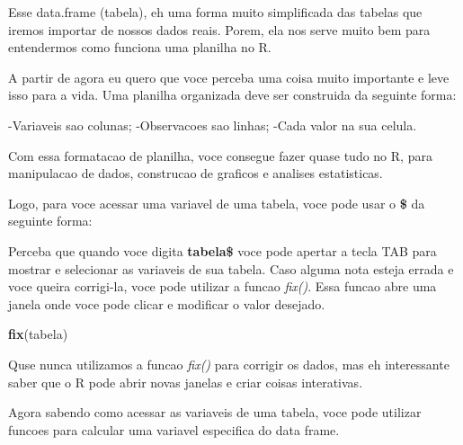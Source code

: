 \documentclass[
]{book}
\newenvironment{Shaded}{\begin{snugshade}}{\end{snugshade}}
\newcommand{\CommentTok}[1]{\textcolor[rgb]{0.56,0.35,0.01}{\textit{#1}}}
\newcommand{\FunctionTok}[1]{\textcolor[rgb]{0.13,0.29,0.53}{\textbf{#1}}}
\newcommand{\NormalTok}[1]{#1}
\newcommand{\SpecialCharTok}[1]{\textcolor[rgb]{0.81,0.36,0.00}{\textbf{#1}}}
\begin{document}
Esse data.frame (tabela), eh uma forma muito simplificada das tabelas que iremos importar de nossos dados reais. Porem, ela nos serve muito bem para entendermos como funciona uma planilha no R.

A partir de agora eu quero que voce perceba uma coisa muito importante e leve isso para a vida. Uma planilha organizada deve ser construida da seguinte forma:

-Variaveis sao colunas;
-Observacoes sao linhas;
-Cada valor na sua celula.

Com essa formatacao de planilha, voce consegue fazer quase tudo no R, para manipulacao de dados, construcao de graficos e analises estatisticas.

Logo, para voce acessar uma variavel de uma tabela, voce pode usar o \textbf{\$} da seguinte forma:

\begin{Shaded}
\end{Shaded}

Perceba que quando voce digita \textbf{tabela\$} voce pode apertar a tecla TAB para mostrar e selecionar as variaveis de sua tabela. Caso alguma nota esteja errada e voce queira corrigi-la, voce pode utilizar a funcao \emph{fix()}. Essa funcao abre uma janela onde voce pode clicar e modificar o valor desejado.

\begin{Shaded}
\begin{Highlighting}[]

\FunctionTok{fix}\NormalTok{(tabela)}
\end{Highlighting}
\end{Shaded}

Quse nunca utilizamos a funcao \emph{fix()} para corrigir os dados, mas eh interessante saber que o R pode abrir novas janelas e criar coisas interativas.

Agora sabendo como acessar as variaveis de uma tabela, voce pode utilizar funcoes para calcular uma variavel especifica do data frame.

\begin{Shaded}
\end{Shaded}
\end{document}
